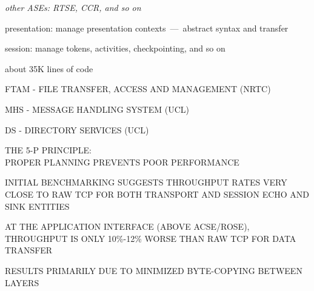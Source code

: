

\begin{note}\em
other ASEs: RTSE, CCR, and so on

presentation: manage presentation contexts~---~abstract syntax and transfer

session: manage tokens, activities, checkpointing, and so on

about 35K lines of code
\end{note}




\begin{bwslide}

\begin{nrtc}
\item	FTAM - FILE TRANSFER, ACCESS AND MANAGEMENT (NRTC)

\item	MHS - MESSAGE HANDLING SYSTEM (UCL)

\item	DS - DIRECTORY SERVICES (UCL)
\end{nrtc}
\end{bwslide}


\begin{bwslide}

\begin{nrtc}
\item	THE 5-P PRINCIPLE:\\
	PROPER PLANNING PREVENTS POOR PERFORMANCE

\item	INITIAL BENCHMARKING SUGGESTS THROUGHPUT RATES VERY CLOSE TO RAW TCP
	FOR BOTH TRANSPORT AND SESSION ECHO AND SINK ENTITIES

\item	AT THE APPLICATION INTERFACE (ABOVE ACSE/ROSE),
	THROUGHPUT IS ONLY 10\%-12\% WORSE THAN RAW TCP FOR DATA TRANSFER

\item	RESULTS PRIMARILY DUE TO MINIMIZED BYTE-COPYING BETWEEN LAYERS
\end{nrtc}
\end{bwslide}


